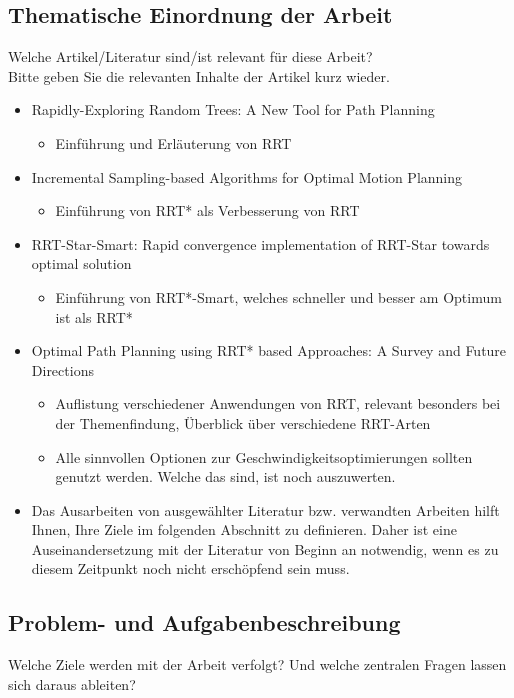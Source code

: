 \documentclass[pdftex,a4paper,12pt]{scrartcl}
\begin{document}
\subsection{Thematische Einordnung der Arbeit}
 Welche Artikel/Literatur sind/ist relevant für diese Arbeit? \\
 Bitte geben Sie die relevanten Inhalte der Artikel kurz wieder.
\begin{itemize}
	\item Rapidly-Exploring Random Trees: A New Tool for Path Planning \cite{Lav98}
	\begin{itemize}
		\item Einführung und Erläuterung von RRT
	\end{itemize}	
	\item Incremental Sampling-based Algorithms for Optimal Motion Planning \cite{KaFra10}
	\begin{itemize}
		\item Einführung von RRT* als Verbesserung von RRT
	\end{itemize}
	\item RRT-Star-Smart: Rapid convergence implementation of RRT-Star towards optimal solution \cite{IsMaNa12}
	\begin{itemize}		
		\item Einführung von RRT*-Smart, welches schneller und besser am Optimum ist als RRT*
	\end{itemize}
	\item Optimal Path Planning using RRT* based Approaches: A Survey and Future Directions \cite{NoKhaHa16}
	\begin{itemize}
		\item Auflistung verschiedener Anwendungen von RRT, relevant besonders bei der Themenfindung, Überblick über verschiedene RRT-Arten
		\item Alle sinnvollen Optionen zur Geschwindigkeitsoptimierungen sollten genutzt werden. Welche das sind, ist noch auszuwerten.
	\end{itemize}
	\item Das Ausarbeiten von ausgewählter Literatur bzw. verwandten Arbeiten hilft Ihnen, Ihre Ziele im folgenden Abschnitt zu definieren. Daher ist eine Auseinandersetzung mit der Literatur von Beginn an notwendig, wenn es zu diesem Zeitpunkt noch nicht erschöpfend sein muss.
\end{itemize}

\subsection{Problem- und Aufgabenbeschreibung} 
Welche Ziele werden mit der Arbeit verfolgt? Und welche zentralen Fragen lassen sich daraus ableiten?
	
\end{document}
